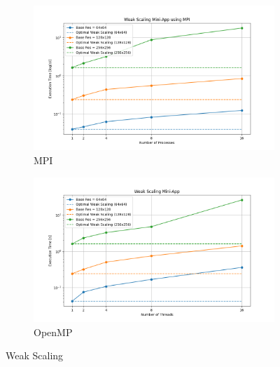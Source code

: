 \begin{figure}[H]
	\centering
	\begin{subfigure}{0.8\textwidth}
		\includegraphics[width=\textwidth]{./media/weak_scaling.png}
		\caption{MPI}
		\label{fig:mpi-weak}
	\end{subfigure}
	\begin{subfigure}{0.8\textwidth}
		\includegraphics[width=\textwidth]{./media/weak_scaling_omp.png}
		\caption{OpenMP}
		\label{fig:openmp-weak}
	\end{subfigure}
	\caption{Weak Scaling}
	\label{fig:weak_scaling}
\end{figure}


